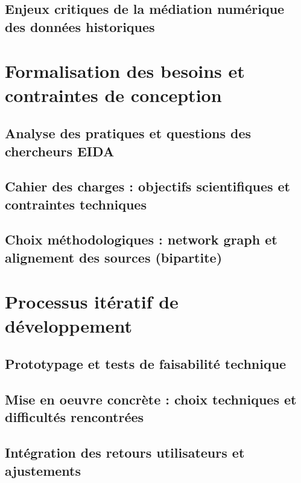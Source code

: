 \documentclass[a4paper,12pt,twoside]{book}
\newcommand{\clearemptydoublepage}{\newpage{\pagestyle{empty}\cleardoublepage}}
\begin{document}
	\section{Enjeux critiques de la médiation numérique des données historiques}
	
	
	\clearemptydoublepage
	
	\chapter{Formalisation des besoins et contraintes de conception}
	\section{Analyse des pratiques et questions des chercheurs EIDA}
	
	
	\section{Cahier des charges : objectifs scientifiques et contraintes techniques}
	
	
	\section{Choix méthodologiques : network graph et alignement des sources (bipartite)}
	
	
	\clearemptydoublepage
	
	\chapter{Processus itératif de développement}
	\section{Prototypage et tests de faisabilité technique}
	
	
	\section{Mise en oeuvre concrète : choix techniques et difficultés rencontrées}
	
	
	\section{Intégration des retours utilisateurs et ajustements}
	
	
\end{document}
